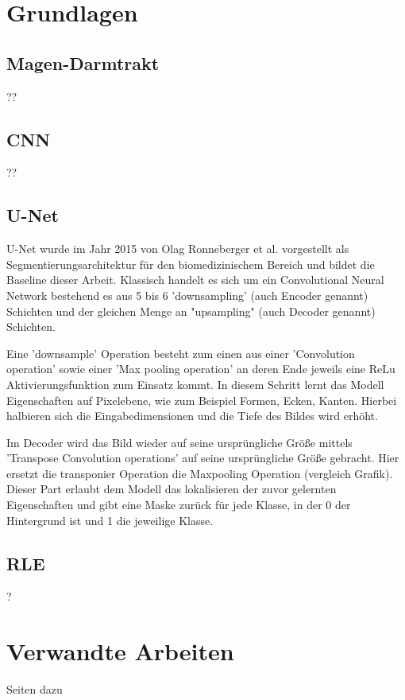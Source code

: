 \newcommand{\source}[1]{\caption*{Source: {#1}} }

\section{Grundlagen}\raggedbottom

\subsection{Magen-Darmtrakt}
?? 

\subsection{CNN}
?? 

\subsection{U-Net}

U-Net wurde im Jahr 2015 von Olag Ronneberger et al. vorgestellt als Segmentierungsarchitektur für den biomedizinischem Bereich und bildet die Baseline dieser Arbeit. Klassisch handelt es sich um ein Convolutional Neural Network  bestehend es aus 5 bis 6 'downsampling' (auch Encoder genannt) Schichten und der gleichen Menge an "upsampling" (auch Decoder genannt) Schichten. 

Eine 'downsample' Operation besteht zum einen aus einer 'Convolution operation'  sowie einer 'Max pooling operation' an deren Ende jeweils eine ReLu Aktivierungsfunktion zum Einsatz kommt. In diesem Schritt lernt das Modell Eigenschaften auf Pixelebene, wie zum Beispiel Formen, Ecken, Kanten. Hierbei halbieren sich die Eingabedimensionen und die Tiefe des Bildes wird erhöht. 

Im Decoder wird das Bild wieder auf seine ursprüngliche Größe mittels 'Transpose Convolution operations' auf seine ursprüngliche Größe gebracht. Hier ersetzt die transponier Operation die Maxpooling Operation (vergleich Grafik). Dieser Part erlaubt dem Modell das lokalisieren der zuvor gelernten Eigenschaften und gibt eine Maske zurück für jede Klasse, in der 0 der Hintergrund ist und 1 die jeweilige Klasse. 

\subsection{RLE}
?

\section{Verwandte Arbeiten} Seiten dazu

